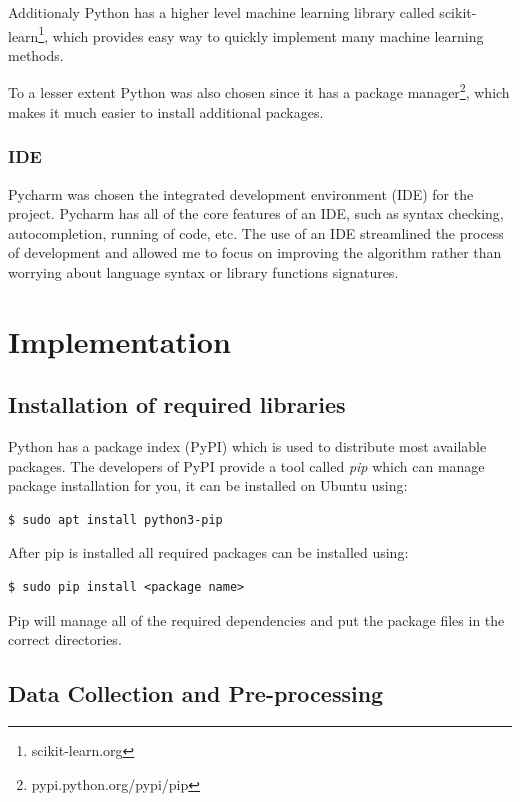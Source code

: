 \documentclass[12pt,a4paper]{book}
\begin{document}
Additionaly Python has a higher level machine learning library called scikit-learn\footnote{scikit-learn.org}, which provides easy way to quickly implement many machine learning methods.

To a lesser extent Python was also chosen since it has a package manager\footnote{pypi.python.org/pypi/pip}, which makes it much easier to install additional packages.

\subsection{IDE}
Pycharm was chosen the integrated development environment (IDE) for the project.
Pycharm has all of the core features of an IDE, such as syntax checking, autocompletion, running of code, etc.
The use of an IDE streamlined the process of development and allowed me to focus on improving the algorithm rather than worrying about language syntax or library functions signatures. 


\chapter{Implementation}
\section{Installation of required libraries}
Python has a package index (PyPI) which is used to distribute most available packages.
The developers of PyPI provide a tool called \emph{pip} which can manage package installation for you, it can be installed on Ubuntu using:
\begin{verbatim}
$ sudo apt install python3-pip
\end{verbatim}
After pip is installed all required packages can be installed using:
\begin{verbatim}
$ sudo pip install <package name>
\end{verbatim}
Pip will manage all of the required dependencies and put the package files in the correct directories.
\section{Data Collection and Pre-processing}
\end{document}
